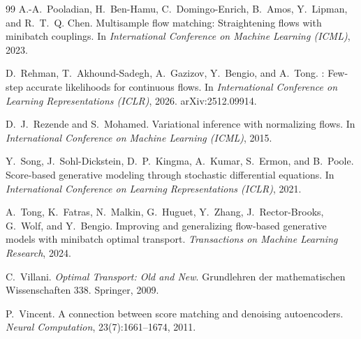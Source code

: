 \documentclass[11pt,a4paper]{article}
\numberwithin{equation}{section}     %
\theoremstyle{plain}        %
\theoremstyle{definition}   %
\theoremstyle{remark}       %
\begin{document}
\begin{thebibliography}{99}
A.-A.~Pooladian, H.~Ben-Hamu, C.~Domingo-Enrich, B.~Amos, Y.~Lipman, and R.~T.~Q. Chen.
\newblock Multisample flow matching: Straightening flows with minibatch couplings.
\newblock In \emph{International Conference on Machine Learning (ICML)}, 2023.

D.~Rehman, T.~Akhound-Sadegh, A.~Gazizov, Y.~Bengio, and A.~Tong.
: Few-step accurate likelihoods for continuous flows.
\newblock In \emph{International Conference on Learning Representations (ICLR)}, 2026. arXiv:2512.09914.

D.~J.~Rezende and S.~Mohamed.
\newblock Variational inference with normalizing flows.
\newblock In \emph{International Conference on Machine Learning (ICML)}, 2015.

Y.~Song, J.~Sohl-Dickstein, D.~P.~Kingma, A.~Kumar, S.~Ermon, and B.~Poole.
\newblock Score-based generative modeling through stochastic differential equations.
\newblock In \emph{International Conference on Learning Representations (ICLR)}, 2021.

A.~Tong, K.~Fatras, N.~Malkin, G.~Huguet, Y.~Zhang, J.~Rector-Brooks, G.~Wolf, and Y.~Bengio.
\newblock Improving and generalizing flow-based generative models with minibatch optimal transport.
\newblock \emph{Transactions on Machine Learning Research}, 2024.

C.~Villani.
\newblock \emph{Optimal Transport: Old and New}.
\newblock Grundlehren der mathematischen Wissenschaften 338. Springer, 2009.

P.~Vincent.
\newblock A connection between score matching and denoising autoencoders.
\newblock \emph{Neural Computation}, 23(7):1661--1674, 2011.

\end{thebibliography}
\end{document}
